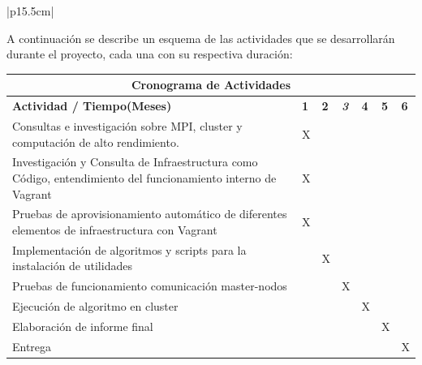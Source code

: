 \documentclass[letter,12pt]{article}
\begin{document}
\begin{center}
\begin{tabular}{|p{15.5cm}|}
\hline
{}\\
\hline

A continuación se describe un esquema de las actividades que se desarrollarán durante el proyecto, cada una con su respectiva duración:
    
    \begin{center}
    \begin{tabular}{|p{9.5cm}|p{0.4cm}|p{0.4cm}|p{0.4cm}|p{0.4cm}|p{0.4cm}|p{0.4cm}|}
    \hline
    \multicolumn{7}{|c|}{\textbf{Cronograma de Actividades}}\\
    \hline
    \textbf{Actividad / Tiempo(Meses)} & \textbf{1} & \textbf{2} & \textit{\textbf{3}} & \textbf{4} & \textbf{5} & \textbf{6} \\
    \hline
    Consultas e investigación sobre MPI, cluster y computación de alto rendimiento. & X &   &   &   &   &   \\
    \hline
    Investigación y Consulta de Infraestructura como Código, entendimiento del funcionamiento interno de Vagrant & X &   &   &   &   &   \\
    \hline
    Pruebas de aprovisionamiento automático de diferentes elementos de infraestructura con Vagrant & X &   &   &   &   &   \\
    \hline
    Implementación de algoritmos y scripts para la instalación de utilidades &  & X  &   &   &   &   \\
    \hline
    Pruebas de funcionamiento comunicación master-nodos &   &   & X &   &   &   \\
    \hline
    Ejecución de algoritmo en cluster &   &   &   & X &   &   \\
    \hline
    Elaboración de informe final &   &   &   &   & X &   \\
    \hline
    Entrega &   &   &   &   &   & X \\
    \hline
    \end{tabular}
    \end{center} \\

\hline
\end{tabular}
\end{center}
\end{document}
